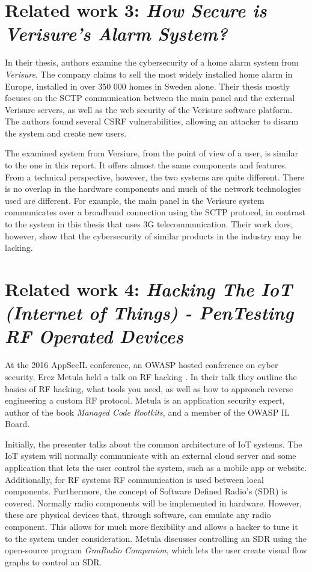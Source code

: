 \section{Related work 3: \textit{How Secure is Verisure’s Alarm System?}}
In their thesis, authors \citeauthor{verisurethesis} examine the cybersecurity of a home alarm system from \textit{Verisure}. The company claims to sell the most widely installed home alarm in Europe, installed in over 350 000 homes in Sweden alone. Their thesis mostly focuses on the SCTP communication between the main panel and the external Verisure servers, as well as the web security of the Verisure software platform. The authors found several \gls{CSRF} vulnerabilities, allowing an attacker to disarm the system and create new users.

The examined system from Versiure, from the point of view of a user, is similar to the one in this report. It offers almost the same components and features. From a technical perspective, however, the two systems are quite different. There is no overlap in the hardware components and much of the network technologies used are different. For example, the main panel in the Verisure system communicates over a broadband connection using the SCTP protocol, in contrast to the system in this thesis that uses 3G telecommunication. Their work does, however, show that the cybersecurity of similar products in the industry may be lacking.

\section{Related work 4: \textit{Hacking The IoT (Internet of Things) - PenTesting RF Operated Devices}} \label{ch:related-work:hacking-iot}
At the 2016 AppSecIL conference, an OWASP hosted conference on cyber security, Erez Metula held a talk on RF hacking \cite{hacking-the-iot-talk}. In their talk they outline the basics of RF hacking, what tools you need, as well as how to approach reverse engineering a custom RF protocol. Metula is an application security expert, author of the book \textit{Managed Code Rootkits}, and a member of the OWASP IL Board.

Initially, the presenter talks about the common architecture of IoT systems. The IoT system will normally communicate with an external cloud server and some application that lets the user control the system, such as a mobile app or website. Additionally, for RF systems RF communication is used between local components. Furthermore, the concept of Software Defined Radio's (\gls{SDR}) is covered. Normally radio components will be implemented in hardware. However, these are physical devices that, through software, can emulate any radio component. This allows for much more flexibility and allows a hacker to tune it to the system under consideration. Metula discusses controlling an SDR using the open-source program \textit{GnuRadio Companion}, which lets the user create visual flow graphs to control an SDR.

